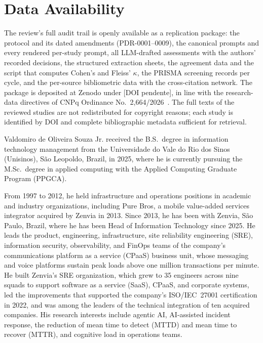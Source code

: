 \documentclass{ieeeaccess}
\begin{document}
\section*{Data Availability}

The review's full audit trail is openly available as a replication
package: the protocol and its dated amendments (PDR-0001--0009), the
canonical prompts and every rendered per-study prompt, all LLM-drafted
assessments with the authors' recorded decisions, the structured
extraction sheets, the agreement data and the script that computes
Cohen's and Fleiss' $\kappa$, the PRISMA screening records per cycle,
and the per-source bibliometric data with the cross-citation network.
The package is deposited at Zenodo under [DOI pendente], in line with
the research-data directives of CNPq Ordinance
No.~2{,}664/2026~\cite{cnpq2664}. The full texts of the reviewed
studies are not redistributed for copyright reasons; each study is
identified by DOI and complete bibliographic metadata sufficient for
retrieval.




\begin{IEEEbiographynophoto}{Valdomiro de Oliveira Souza Jr.}
received the B.S.\ degree in information technology management from the
Universidade do Vale do Rio dos Sinos (Unisinos), S\~ao Leopoldo,
Brazil, in 2025, where he is currently pursuing the M.Sc.\ degree in
applied computing with the Applied Computing Graduate Program (PPGCA).

From 1997 to 2012, he held infrastructure and operations positions in
academic and industry organizations, including Pure Bros, a mobile
value-added services integrator acquired by Zenvia in 2013. Since 2013,
he has been with Zenvia, S\~ao Paulo, Brazil, where he has been Head of
Information Technology since 2025. He leads the product, engineering,
infrastructure, site reliability engineering (SRE), information
security, observability, and FinOps teams of the company's
communications platform as a service (CPaaS) business unit, whose
messaging and voice platforms sustain peak loads above one million
transactions per minute. He built Zenvia's SRE organization, which grew
to 35 engineers across nine squads to support software as a service
(SaaS), CPaaS, and corporate systems, led the improvements that
supported the company's ISO/IEC~27001 certification in 2022, and was
among the leaders of the technical integration of ten acquired
companies. His research interests include agentic AI, AI-assisted
incident response, the reduction of mean time to detect (MTTD) and mean
time to recover (MTTR), and cognitive load in operations teams.
\end{IEEEbiographynophoto}
\end{document}
